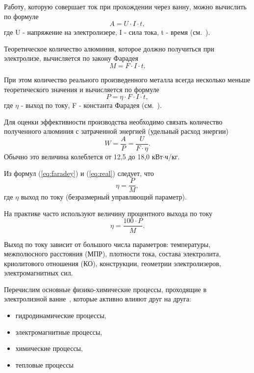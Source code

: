 \documentclass{article}
\begin{document}
Работу, которую совершает ток при прохождении через ванну, можно вычислить по формуле
\begin{equation}
 A=U \cdot I \cdot t,
\end{equation}
где U - напряжение на электролизере, I - сила тока, t - время (см.~\cite{litlink:derkach}).

Теоретическое количество алюминия, которое должно получиться при электролизе, вычисляется по закону Фарадея
\begin{equation}\label{eq:faradey}
M=F \cdot I \cdot t.
\end{equation}

При этом количество реального произведенного металла всегда несколько меньше теоретического значения и вычисляется по формуле 
\begin{equation}\label{eq:real}
P=\eta \cdot F \cdot I \cdot t,
\end{equation}
где $\eta$ - выход по току, F - константа Фарадея (см.~\cite{litlink:derkach}).

Для оценки эффективности производства необходимо связать количество полученного алюминия с затраченной энергией (удельный расход энергии)
\begin{equation}
W=\frac{A}{P}=\frac{U}{F \cdot \eta}.
\end{equation}
Обычно это величина колеблется от 12,5 до 18,0 кВт$\cdot$ч/кг. 

Из формул (\ref{eq:faradey}) и (\ref{eq:real}) следует, что
\begin{equation*}
\eta=\frac{P}{M},
\end{equation*}
где $\eta$ выход по току (безразмерный управляющий параметр).

На практике часто используют величину процентного выхода по току
\begin{equation}
\eta=\frac{100 \cdot P}{M}.
\end{equation}

Выход по току зависит от большого числа параметров: температуры, межполюсного расстояния (МПР), плотности тока, состава электролита, криолитового отношения (КО), конструкции, геометрии электролизеров, электромагнитных сил.

Перечислим основные физико-химические процессы, проходящие в электролизной ванне~\cite{litlink:kalmykov}, которые активно влияют друг на друга:
\begin{itemize}
\item гидродинамические процессы,
\item электромагнитные процессы,
\item химические процессы,
\item тепловые процессы
\end{itemize}
\end{document}
